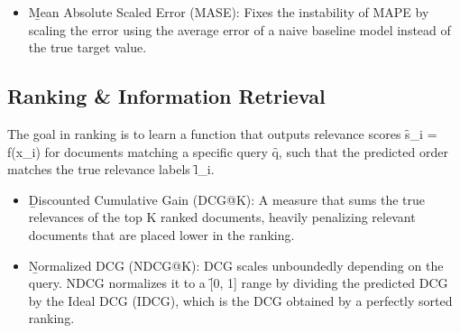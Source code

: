 
\begin{itemize}
\item \b{Mean Absolute Scaled Error (MASE)}: Fixes the instability of MAPE by scaling the error using the average error of a naive baseline model instead of the true target value.
\end{itemize}











\subsection{Ranking \& Information Retrieval}
The goal in ranking is to learn a function that outputs relevance scores \f{s_i = f(x_i)} for documents matching a specific query \f{q}, such that the predicted order matches the true relevance labels \f{l_i}.
\begin{itemize}
\item \b{Discounted Cumulative Gain (DCG@K)}: A measure that sums the true relevances of the top K ranked documents, heavily penalizing relevant documents that are placed lower in the ranking.
\item \b{Normalized DCG (NDCG@K)}: DCG scales unboundedly depending on the query. NDCG normalizes it to a \f{[0, 1]} range by dividing the predicted DCG by the Ideal DCG (IDCG), which is the DCG obtained by a perfectly sorted ranking.
\end{itemize}



\vfill
{}